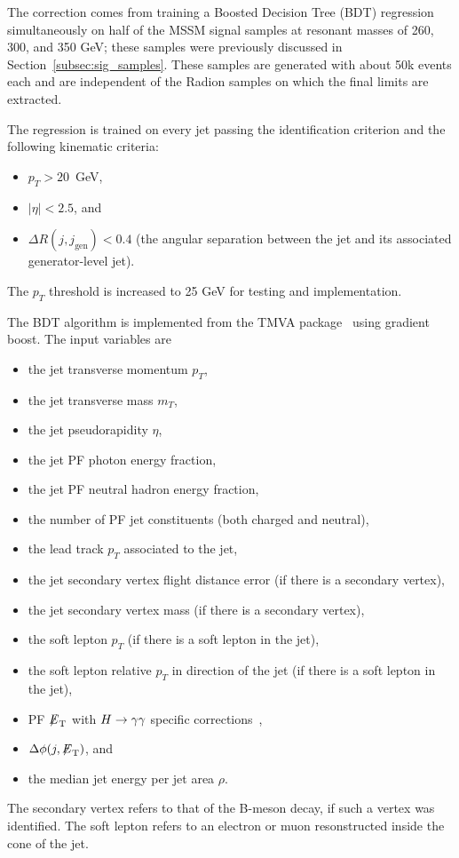 The correction comes from training a Boosted Decision Tree (BDT) regression simultaneously
on half of the MSSM signal
samples at resonant masses of 260, 300, and 350 GeV; these samples were previously
discussed in Section~\ref{subsec:sig_samples}.
These samples are generated with about 50k events each and are independent of the Radion
samples on which the final limits are extracted.

The regression is trained on every jet passing the identification criterion and the
following kinematic criteria:
\begin{itemize}
\item $p_T > 20$~GeV,
\item $|\eta|<2.5$, and
\item $\Delta R (j, j_\text{gen}) < 0.4$ (the angular separation between the jet and its associated
generator-level jet).
\end{itemize}                                                                                           
The $p_T$ threshold is increased to 25 GeV for testing and implementation.

The BDT algorithm is implemented from the TMVA package~\cite{TMVA2007} using gradient boost.
The input variables are
\begin{itemize}
\item the jet transverse momentum $p_T$,
\item the jet transverse mass $m_T$,
\item the jet pseudorapidity $\eta$,
\item the jet PF photon energy fraction,
\item the jet PF neutral hadron energy fraction,
\item the number of PF jet constituents (both charged and neutral),
\item the lead track $p_T$ associated to the jet,
\item the jet secondary vertex flight distance error (if there is a secondary vertex),
\item the jet secondary vertex mass (if there is a secondary vertex),
\item the soft lepton $p_T$ (if there is a soft lepton in the jet),
\item the soft lepton relative $p_T$ in direction of the jet (if there is a soft lepton in the jet),
\item PF ${\not\mathrel{E}}_{\text{T}}$ with $H\to\gamma\gamma$ specific corrections~\cite{HggCMS},
\item $\Delta \phi (j, {\not\mathrel{E}}_{\text{T}})$, and
\item the median jet energy per jet area $\rho$. 
\end{itemize}
The secondary vertex refers to that of the B-meson decay, if such a vertex was identified.
The soft lepton refers to an electron or muon resonstructed inside the cone of the jet.

